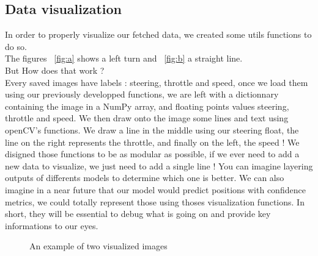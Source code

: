 \documentclass[12pt]{article}
\begin{document}
\subsection{Data visualization}
In order to properly visualize our fetched data, we created some utils functions to do so.\\
The figures ~\ref{fig:a} shows a left turn and ~\ref{fig:b} a straight line. \\ But How does that work ? \\ Every saved images have labels : steering, throttle and speed, once we load them using our previously developped functions, we are left with a dictionnary containing the image in a NumPy array, and floating points values steering, throttle and speed. We then draw onto the image some lines and text using openCV's functions. We draw a line in the middle using our steering float, the line on the right represents the throttle, and finally on the left, the speed ! We disigned those functions to be as modular as possible, if we ever need to add a new data to visualize, we just need to add a single line ! You can imagine layering outputs of differents models to determine which one is better. We can also imagine in a near future that our model would predict positions with confidence metrics, we could totally represent those using thoses visualization functions. In short, they will be essential to debug what is going on and provide key informations to our eyes.

\begin{figure}[h]
    \centering
    \hfill%
    \caption{An example of two visualized images}
\end{figure}
\end{document}
